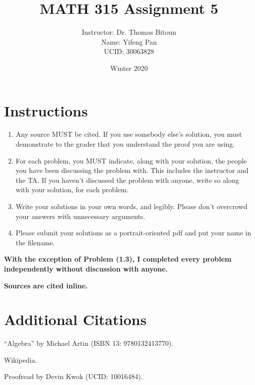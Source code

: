 \documentclass[10pt, letterpaper, titlepage]{article}
\title{MATH 315 Assignment 5}
\author{Instructor: Dr. Thomas Bitoun
    \\Name: Yifeng Pan
    \\UCID: 30063828}
\date{Winter 2020}
\begin{document}
    \maketitle


    \newcommand*\na{\footnote{No additional references used.}}

    \section*{Instructions}
    \begin{enumerate}
        \item Any source MUST be cited. If you use somebody else’s solution, you must demonstrate to the
        grader that you understand the proof you are using.
        \item For each problem, you MUST indicate, along with your solution, the people you have
        been discussing the problem with. This includes the instructor and the TA. If you
        haven’t discussed the problem with anyone, write so along with your solution, for each
        problem.
        \item Write your solutions in your own words, and legibly. Please don’t overcrowd your answers with
        unnecessary arguments.
        \item Please submit your solutions as a portrait-oriented pdf and put your name in the
        filename.
    \end{enumerate}

    \textbf{With the exception of Problem (1.3),
    I completed every problem independently without discussion with anyone.}

    \textbf{Sources are cited inline.}



    \newpage
    
    \newpage
    
    \newpage
    

    \section*{Additional Citations}
        ``Algebra'' by Michael Artin
        (ISBN 13: 9780132413770).

        Wikipedia.

        Proofread by Devin Kwok
        (UCID: 10016484).
        
\end{document}
